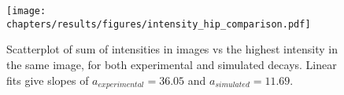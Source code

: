 \begin{figure}
\centering
\texttt{[image: chapters/results/figures/intensity\_hip\_comparison.pdf]}
\caption{\label{fig:intensity-hip-comparison}Scatterplot of sum of intensities in images vs
the highest intensity in the same image, for both experimental and simulated decays.
Linear fits give slopes of $a_{experimental}=36.05$ and $a_{simulated}=11.69$.}
\end{figure}